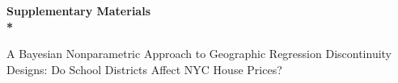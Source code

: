 \documentclass[aoas,preprint]{imsart}
\newcommand{\georddtitle}{
    A Bayesian Nonparametric Approach to Geographic Regression Discontinuity Designs:
    Do School Districts Affect NYC House Prices?
}
\begin{document}
\begin{frontmatter}
    \begin{abstract}
        
    \end{abstract}

    \begin{keyword}[class=MSC]
    \end{keyword}

    \begin{keyword}
    \kwd{\LaTeXe}
    \end{keyword}

\end{frontmatter}


\begin{appendices}
    
\end{appendices}




\pagebreak
\begin{center}
    \bf 
    \LARGE
    Supplementary Materials
    \\*
    \large
    \georddtitle
\end{center}
\setcounter{equation}{0}
\setcounter{figure}{0}
\setcounter{table}{0}
\setcounter{section}{0}
\newcommand{\sprefix}{S-}
\renewcommand{\theequation}{\sprefix\arabic{equation}}
\renewcommand{\thesection}{\sprefix\arabic{section}}
\renewcommand{\thefigure}{\sprefix\arabic{figure}}
\renewcommand{\thetable}{\sprefix\arabic{table}}


\end{document}
